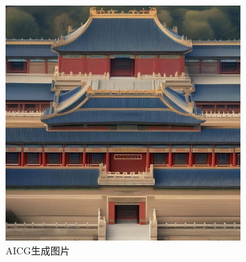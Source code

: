 \documentclass{ctexart}
\begin{document}
\begin{figure}[htbp]
    \centering
    \includegraphics[width=0.8\textwidth]{figure/The_Imperial_Palace.jpeg}
    \caption{AICG生成图片}
\end{figure}
\end{document}
